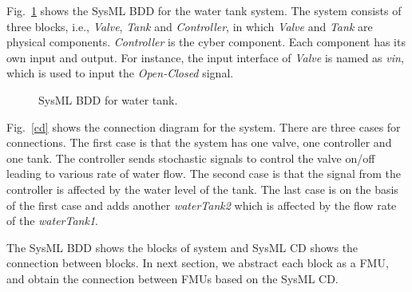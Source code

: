 Fig.~\ref{myad} shows the SysML BDD for the water tank system. The system consists of three blocks, i.e., \emph{Valve}, \emph{Tank} and \emph{Controller}, in which \emph{Valve} and \emph{Tank} are physical components. \emph{Controller} is the cyber component. Each component has its own input and output. For instance, the input interface of \emph{Valve} is named as \emph{vin}, which is used to input the \emph{Open-Closed} signal. 
\begin{figure}[htbp]
	\caption{SysML BDD for water tank.}
	\label{myad}
\end{figure}

Fig.~\ref{cd} shows the connection diagram for the system. There are three cases for connections. The first case is that the system has one valve, one controller and one tank. The controller sends stochastic signals to control the valve on/off leading to various rate of water flow. The second case is that the signal from the controller is affected by the water level of the tank. The last case is on the basis of the first case and adds another \emph{waterTank2} which is affected by the flow rate of the \emph{waterTank1}.

\begin{figure}[htbp]
\end{figure}
The SysML BDD shows the blocks of system and SysML CD shows the connection between blocks. In next section, we abstract each block as a FMU, and obtain the connection between FMUs based on the SysML CD.

